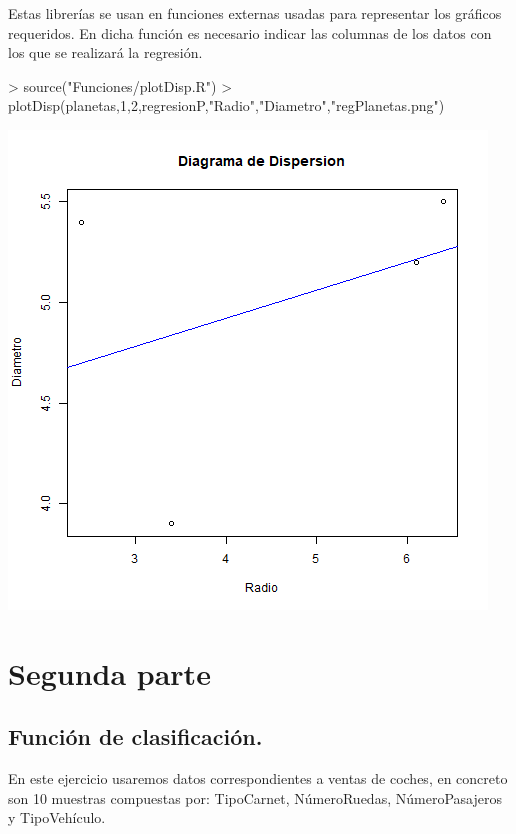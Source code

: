 \documentclass [a4paper] {article}
\begin{document}
\bigskip
Estas librerías se usan en funciones externas usadas para representar los gráficos requeridos. En dicha función es necesario
indicar las columnas de los datos con los que se realizará la regresión.
\begin{Schunk}
\begin{Sinput}
> source("Funciones/plotDisp.R")
> plotDisp(planetas,1,2,regresionP,"Radio","Diametro","regPlanetas.png")
\end{Sinput}
\end{Schunk}
\includegraphics[width=\textwidth]{regPlanetas}


\section{Segunda parte}
\subsection{Función de clasificación.}
En este ejercicio usaremos datos correspondientes a ventas de coches, en concreto son 10 muestras compuestas por: TipoCarnet, 
NúmeroRuedas, NúmeroPasajeros y TipoVehículo.
\end{document}
